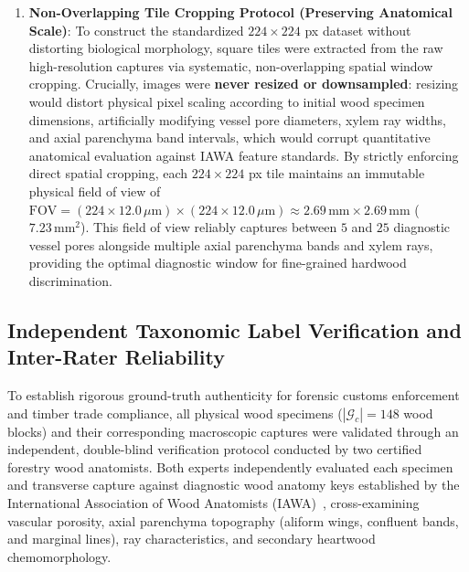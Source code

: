\documentclass[a4paper,fleqn,12pt]{cas-sc}
\begin{document}
\begin{enumerate}[leftmargin=*,itemsep=2pt,topsep=2pt]
    \item \textbf{Non-Overlapping Tile Cropping Protocol (Preserving Anatomical Scale)}: To construct the standardized $224 \times 224$ px dataset without distorting biological morphology, square tiles were extracted from the raw high-resolution captures via systematic, non-overlapping spatial window cropping. Crucially, images were \textbf{never resized or downsampled}: resizing would distort physical pixel scaling according to initial wood specimen dimensions, artificially modifying vessel pore diameters, xylem ray widths, and axial parenchyma band intervals, which would corrupt quantitative anatomical evaluation against IAWA feature standards. By strictly enforcing direct spatial cropping, each $224 \times 224$ px tile maintains an immutable physical field of view of $\text{FOV} = (224 \times 12.0\,\mu\text{m}) \times (224 \times 12.0\,\mu\text{m}) \approx 2.69\,\text{mm} \times 2.69\,\text{mm}$ ($7.23\,\text{mm}^2$). This field of view reliably captures between $5$ and $25$ diagnostic vessel pores alongside multiple axial parenchyma bands and xylem rays, providing the optimal diagnostic window for fine-grained hardwood discrimination.
\end{enumerate}

\subsection{Independent Taxonomic Label Verification and Inter-Rater Reliability}
\label{sec:inter_rater}

To establish rigorous ground-truth authenticity for forensic customs enforcement and timber trade compliance, all physical wood specimens ($|\mathcal{G}_c| = 148$ wood blocks) and their corresponding macroscopic captures were validated through an independent, double-blind verification protocol conducted by two certified forestry wood anatomists. Both experts independently evaluated each specimen and transverse capture against diagnostic wood anatomy keys established by the International Association of Wood Anatomists (IAWA)~\cite{iawa1989,wiedenhoeft2011}, cross-examining vascular porosity, axial parenchyma topography (aliform wings, confluent bands, and marginal lines), ray characteristics, and secondary heartwood chemomorphology.
\end{document}
